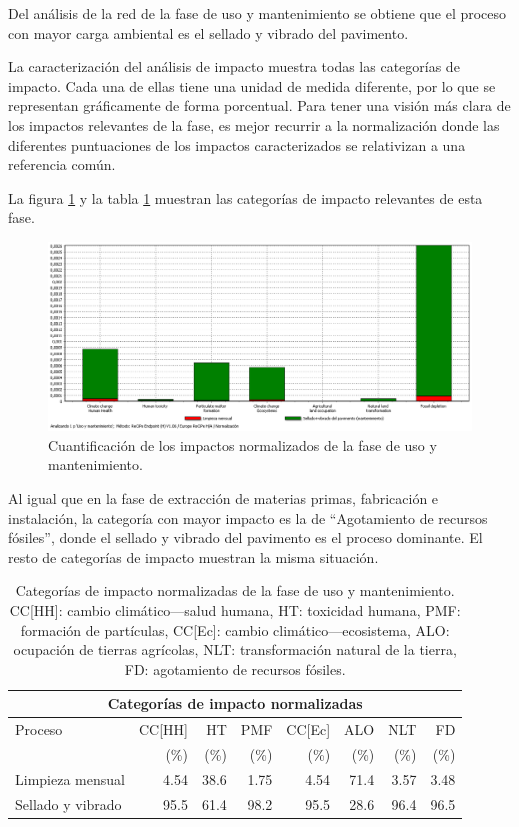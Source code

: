 Del análisis de la red de la fase de uso y mantenimiento se obtiene que el proceso con mayor carga ambiental es el sellado y vibrado del pavimento.

La caracterización del análisis de impacto muestra todas las categorías de impacto. Cada una de ellas tiene una unidad de medida diferente, por lo que se representan gráficamente de forma porcentual. Para tener una visión más clara de los impactos relevantes de la fase, es mejor recurrir a la normalización donde las diferentes puntuaciones de los impactos caracterizados se relativizan a una referencia común.

La figura \ref{fig:uso_normalizacion} y la tabla \ref{categoriasimpactouso} muestran las categorías de impacto relevantes de esta fase.

\begin{figure}[!htb]
\centering
\includegraphics[width=15cm]{img/uso_normalizacion.png}
\caption{Cuantificación de los impactos normalizados de la fase de uso y mantenimiento.}
\label{fig:uso_normalizacion}
\end{figure}

Al igual que en la fase de extracción de materias primas, fabricación e instalación, la categoría con mayor impacto es la de ``Agotamiento de recursos fósiles'', donde el sellado y vibrado del pavimento es el proceso dominante. El resto de categorías de impacto muestran la misma situación.

\begin{table}[!htb]
\centering
\begin{tabular}{p{4cm}rrrrrrr}
\toprule
\multicolumn{8}{c}{Categorías de impacto normalizadas}\\
\midrule
Proceso & CC[HH] & HT & PMF & CC[Ec] & ALO & NLT & FD\\
 &  (\%) & (\%) & (\%) & (\%) & (\%) & (\%) & (\%)\\
\midrule
Limpieza mensual & 4.54 & 38.6 & 1.75 & 4.54 & 71.4 & 3.57 & 3.48\\
Sellado y vibrado & 95.5 & 61.4 & 98.2 & 95.5 & 28.6 & 96.4 & 96.5\\
\bottomrule
\end{tabular}
\caption[Categorías de impacto normalizadas de la fase de uso y mantenimiento.]{Categorías de impacto normalizadas de la fase de uso y mantenimiento. CC[HH]: cambio climático—salud humana, HT: toxicidad humana, PMF: formación de partículas, CC[Ec]: cambio climático—ecosistema, ALO: ocupación de tierras agrícolas, NLT: transformación natural de la tierra, FD: agotamiento de recursos fósiles.}
\label{categoriasimpactouso}
\end{table}

